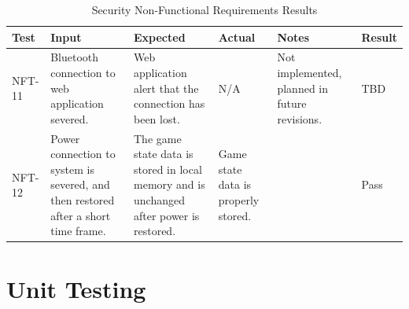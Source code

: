 \documentclass[12pt, titlepage]{article}
\begin{document}
\begin{table}[H]
\centering
    \setlength{\leftmargini}{0cm}
    \begin{tabular}{| >{\centering\arraybackslash}m{1cm} | 
        >{\centering\arraybackslash}m{2.5cm} | 
        >{\centering\arraybackslash}m{4cm} | 
        >{\centering\arraybackslash}m{3cm} |
        >{\centering\arraybackslash}m{3cm} |
        >{\centering\arraybackslash}m{1.5cm} |}
    \hline
    \rowcolor[gray]{0.9}
    Test & Input & Expected & Actual & Notes & Result\\
    \hline
    NFT-11 & Bluetooth connection to web application severed. & Web application alert that the connection has been lost. & N/A & Not implemented, planned in future revisions. & TBD \\
    \hline
    NFT-12 & Power connection to system is severed, and then restored after a short time frame. & The game state data is stored in local memory and is unchanged after power is restored. & Game state data is properly stored. &  & Pass \\
    \hline
    \end{tabular}
\caption{Security Non-Functional Requirements Results}
\end{table}

\section{Unit Testing} \label{UnitTest}
\end{document}
